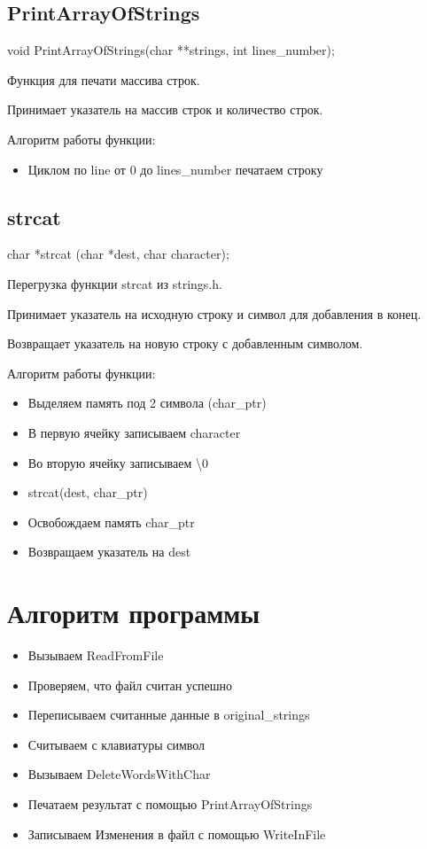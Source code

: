 \documentclass[12pt,a4paper]{article}  %
\begin{document}
	\subsection*{PrintArrayOfStrings}
	void PrintArrayOfStrings(char **strings, int lines\_number);
	
	Функция для печати массива строк.
	
	Принимает указатель на массив строк и количество строк.
	
	Алгоритм работы функции:
	
	\begin{itemize}
		\item Циклом по line от 0 до lines\_number печатаем строку
	\end{itemize}
	
	\subsection*{strcat}
	char *strcat (char *dest, char character);
	
	Перегрузка функции strcat из strings.h.
	
	Принимает указатель на исходную строку и символ для добавления в конец.
	
	Возвращает указатель на новую строку с добавленным символом.
	
	Алгоритм работы функции:
	
	\begin{itemize}
		\item Выделяем память под 2 символа (char\_ptr)
		\item В первую ячейку записываем character
		\item Во вторую ячейку записываем \textbackslash 0
		\item strcat(dest, char\_ptr)
		\item Освобождаем память char\_ptr
		\item Возвращаем указатель на dest
	\end{itemize}

	\section*{Алгоритм программы}
	
	\begin{itemize}
		\item Вызываем ReadFromFile
		\item Проверяем, что файл считан успешно
		\item Переписываем считанные данные в original\_strings
		\item Считываем с клавиатуры символ
		\item Вызываем DeleteWordsWithChar
		\item Печатаем результат с помощью PrintArrayOfStrings
		\item Записываем Изменения в файл с помощью WriteInFile
	\end{itemize}
\end{document}
